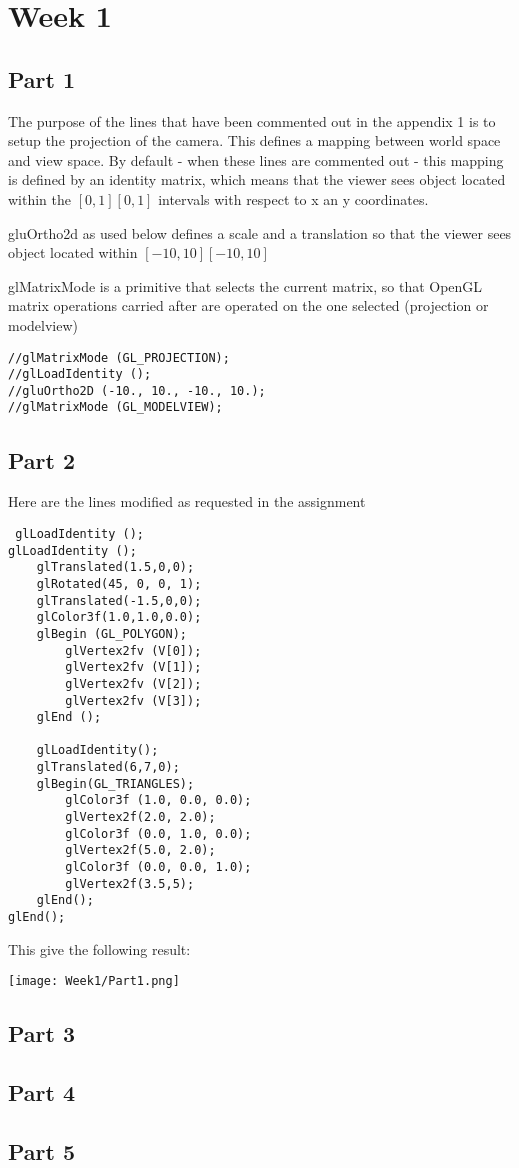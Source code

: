 \chapter{Week 1}

\section{Part 1}
The purpose of the lines that have been commented out in the appendix 1 is to
setup the projection of the camera. This defines a mapping between world space
and view space. By default - when these lines are commented out - this mapping
is defined by an identity matrix, which means that the viewer sees object located
within the $[0,1][0,1]$ intervals with respect to x an y coordinates.

gluOrtho2d as used below defines a scale and a translation so that the viewer sees object
located within $[-10,10][-10,10]$    

glMatrixMode is a primitive that selects the current matrix, so that OpenGL matrix
operations carried after are operated on the one selected (projection or modelview)

\begin{verbatim}
//glMatrixMode (GL_PROJECTION);
//glLoadIdentity ();
//gluOrtho2D (-10., 10., -10., 10.);
//glMatrixMode (GL_MODELVIEW);
\end{verbatim}

\section{Part 2}

Here are the lines modified as requested in the assignment
\begin{verbatim}
 glLoadIdentity ();
glLoadIdentity ();
	glTranslated(1.5,0,0);
	glRotated(45, 0, 0, 1);
	glTranslated(-1.5,0,0);
    glColor3f(1.0,1.0,0.0);
    glBegin (GL_POLYGON);
		glVertex2fv (V[0]);
		glVertex2fv (V[1]);
		glVertex2fv (V[2]);
		glVertex2fv (V[3]);
	glEnd ();

	glLoadIdentity();
	glTranslated(6,7,0);
	glBegin(GL_TRIANGLES);
		glColor3f (1.0, 0.0, 0.0);
		glVertex2f(2.0, 2.0);
		glColor3f (0.0, 1.0, 0.0);
		glVertex2f(5.0, 2.0);
		glColor3f (0.0, 0.0, 1.0);
		glVertex2f(3.5,5);
	glEnd();
glEnd();
\end{verbatim}

This give the following result:

\texttt{[image: Week1/Part1.png]}



\section{Part 3}


\section{Part 4}


\section{Part 5}
